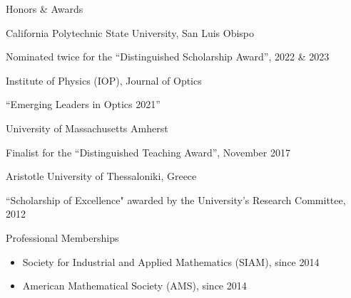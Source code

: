 \documentclass[10pt]{article} %
\newenvironment{outerlist}[1][\enskip\textbullet]%
        {\begin{itemize}[#1]}{\end{itemize}%
         \vspace{-.6\baselineskip}}
\newenvironment{innerlist}[1][\enskip\textbullet]%
        {\begin{compactitem}[#1]}{\end{compactitem}}
\begin{document}
\begin{section}{Honors \& Awards}
\begin{outerlist}

\item[$\bullet$] \vskip -7mm
California Polytechnic State University, San Luis Obispo
\begin{innerlist}
\item[$\triangleright$] Nominated twice for the ``Distinguished Scholarship Award'', 2022 \& 2023
\end{innerlist}
\item[$\bullet$]
Institute of Physics (IOP), Journal of Optics
\begin{innerlist}
\item[$\triangleright$] ``Emerging Leaders in Optics 2021''
\end{innerlist}
\item[$\bullet$] 
University of Massachusetts Amherst
\begin{innerlist}
\item[$\triangleright$] Finalist for the ``Distinguished Teaching Award'', November 2017
\end{innerlist}
\item[$\bullet$] Aristotle University of Thessaloniki, Greece
\begin{innerlist}
\item[$\triangleright$] ``Scholarship of Excellence" awarded by the University's Research Committee, 2012
\end{innerlist}

\end{outerlist}

\end{section}

\begin{section}{Professional Memberships}
\begin{outerlist}
\item\vskip -7mm
Society for Industrial and Applied Mathematics (SIAM), since 2014
\item American Mathematical Society (AMS), since 2014
\end{outerlist}

\end{section}
\end{document}
